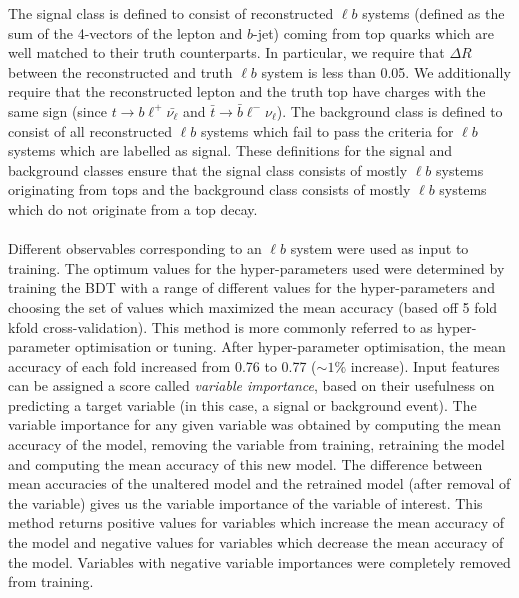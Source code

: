 The signal class is defined to consist of reconstructed $\ell b$ systems (defined as the sum of the 4-vectors of the lepton and $b$-jet) coming from top quarks which are well matched to their truth counterparts. In particular, we require that $\Delta R$ between the reconstructed and truth $\ell b$ system is less than 0.05. We additionally require that the reconstructed lepton and the truth top have charges with the same sign (since $t\rightarrow b\ell^{+}\bar{\nu_{\ell}}$ and $\bar{t}\rightarrow \bar{b}\ell^{-}\nu_{\ell}$). The background class is defined to consist of all reconstructed $\ell b$ systems which fail to pass the criteria for $\ell b$ systems which are labelled as signal. These definitions for the signal and background classes ensure that the signal class consists of mostly $\ell b$ systems originating from tops and the background class consists of mostly $\ell b$ systems which do not originate from a top decay.\\\\

Different observables corresponding to an $\ell b$ system were used as input to training. The optimum values for the hyper-parameters used were determined by training the BDT with a range of different values for the hyper-parameters and choosing the set of values which maximized the mean accuracy (based off 5 fold kfold cross-validation). This method is more commonly referred to as hyper-parameter optimisation or tuning. After hyper-parameter optimisation, the mean accuracy of each fold increased from 0.76 to 0.77 ($\sim 1\%$ increase). Input features can be assigned a score called \textit{variable importance}, based on their usefulness on predicting a target variable (in this case, a signal or background event). The variable importance for any given variable was obtained by computing the mean accuracy of the model, removing the variable from training, retraining the model and computing the mean accuracy of this new model. The difference between mean accuracies of the unaltered model and the retrained model (after removal of the variable) gives us the variable importance of the variable of interest. This method returns positive values for variables which increase the mean accuracy of the model and negative values for variables which decrease the mean accuracy of the model. Variables with negative variable importances were completely removed from training.

